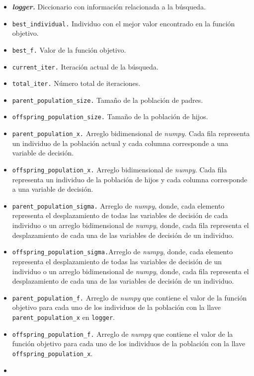 \documentclass[11pt]{article}
\begin{document}
\begin{itemize}
\item
  \emph{\textbf{logger.}} Diccionario con información relacionada a la
  búsqueda.
\item
  \texttt{best\_individual.} Individuo con el mejor valor encontrado en
  la función objetivo.
\item
  \texttt{best\_f.} Valor de la función objetivo.
\item
  \texttt{current\_iter.} Iteración actual de la búsqueda.
\item
  \texttt{total\_iter.} Número total de iteraciones.
\item
  \texttt{parent\_population\_size.} Tamaño de la población de padres.
\item
  \texttt{offspring\_population\_size.} Tamaño de la población de hijos.
\item
  \texttt{parent\_population\_x.} Arreglo bidimensional de \emph{numpy}.
  Cada fila representa un individuo de la población actual y cada
  columna corresponde a una variable de decisión.
\item
  \texttt{offspring\_population\_x.} Arreglo bidimensional de
  \emph{numpy}. Cada fila representa un individuo de la población de
  hijos y cada columna corresponde a una variable de decisión.
\item
  \texttt{parent\_population\_sigma.} Arreglo de \emph{numpy}, donde,
  cada elemento representa el desplazamiento de todas las variables de
  decisión de cada individuo o un arreglo bidimensional de \emph{numpy},
  donde, cada fila representa el desplazamiento de cada una de las
  variables de decisión de un individuo.
\item
  \texttt{offspring\_population\_sigma.}Arreglo de \emph{numpy}, donde,
  cada elemento representa el desplazamiento de todas las variables de
  decisión de un individuo o un arreglo bidimensional de \emph{numpy},
  donde, cada fila representa el desplazamiento de cada una de las
  variables de decisión de un individuo.
\item
  \texttt{parent\_population\_f.} Arreglo de \emph{numpy} que contiene
  el valor de la función objetivo para cada uno de los individuos de la
  población con la llave \texttt{parent\_population\_x} en
  \texttt{logger}.
\item
  \texttt{offspring\_population\_f.} Arreglo de \emph{numpy} que
  contiene el valor de la función objetivo para cada uno de los
  individuos de la población con la llave
  \texttt{offspring\_population\_x}.
\item

\end{itemize}
\end{document}
